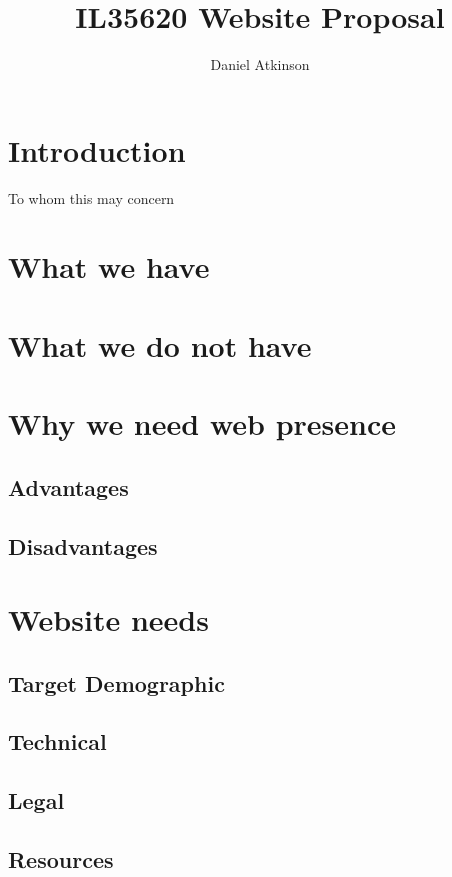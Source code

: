 \documentclass{article}
\begin{document}
\title{IL35620 Website Proposal}

\author{Daniel Atkinson}

\maketitle


\tableofcontents

\section{Introduction}
To whom this may concern
\section{What we have}

\section{What we do not have}

\section{Why we need web presence}

\subsection{Advantages}

\subsection{Disadvantages}

\section{Website needs}

\subsection{Target Demographic}

\subsection{Technical}

\subsection{Legal}

\subsection{Resources}


\end{document}
